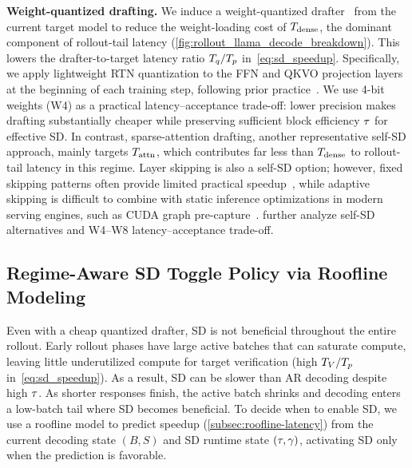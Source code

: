\textbf{Weight-quantized drafting.}
We induce a weight-quantized drafter~\citep{tiwari2025quantspec} from the current target model to reduce the weight-loading cost of $T_{\mathrm{dense}}$, the dominant component of rollout-tail latency (\cref{fig:rollout_llama_decode_breakdown}).
This lowers the drafter-to-target latency ratio $T_q/T_p$ in~\cref{eq:sd_speedup}.
Specifically, we apply lightweight RTN quantization to the FFN and QKVO projection layers at the beginning of each training step, following prior practice~\citep{lin2024awq}.
We use 4-bit weights (W4) as a practical latency--acceptance trade-off: lower precision makes drafting substantially cheaper while preserving sufficient block efficiency $\tau$ for effective SD.
In contrast, sparse-attention drafting, another representative self-SD approach, mainly targets $T_{\mathrm{attn}}$, which contributes far less than $T_{\mathrm{dense}}$ to rollout-tail latency in this regime.
Layer skipping is also a self-SD option; however, fixed skipping patterns often provide limited practical speedup~\citep{xia2024unlocking,song2026knn}, while adaptive skipping is difficult to combine with static inference optimizations in modern serving engines, such as CUDA graph pre-capture~\citep{xia2024swift,chen2025clasp,kwon2023efficient}.
 further analyze self-SD alternatives and W4--W8 latency--acceptance trade-off.


\subsection{Regime-Aware SD Toggle Policy via Roofline Modeling}
\label{subsec:sd-toggle}

Even with a cheap quantized drafter, SD is not beneficial throughout the entire rollout.
Early rollout phases have large active batches that can saturate compute, leaving little underutilized compute for target verification (\ie{}high $T_V/T_p$ in~\cref{eq:sd_speedup}). As a result, SD can be slower than AR decoding despite high $\tau$.
As shorter responses finish, the active batch shrinks and decoding enters a low-batch tail where SD becomes beneficial.
To decide when to enable SD, we use a roofline model to predict speedup (\cref{subsec:roofline-latency}) from the current decoding state $(B,S)$ and SD runtime state $(\tau,\gamma)$, activating SD only when the prediction is favorable.

